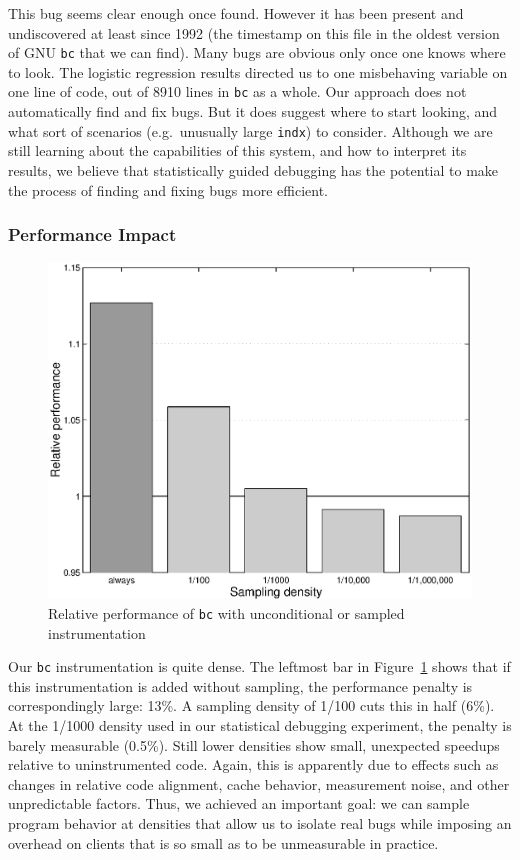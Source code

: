 This bug seems clear enough once found.  However it has been present
and undiscovered at least since 1992 (the time\-stamp on this file in
the oldest version of GNU \texttt{bc} that we can find).  Many bugs
are obvious only once one knows where to look.  The logistic
regression results directed us to one misbehaving variable on one line
of code, out of 8910 lines in \texttt{bc} as a whole.  Our approach
does not automatically find and fix bugs.  But it does suggest where
to start looking, and what sort of scenarios (e.g.\ unusually large
\texttt{indx}) to consider.  Although we are still learning about the
capabilities of this system, and how to interpret its results, we
believe that statistically guided debugging has the potential to make
the process of finding and fixing bugs more efficient.

\subsubsection{Performance Impact}

\begin{figure}
  \centering
  \small
  \includegraphics[width=\columnwidth]{applications/bc_density}
  \caption{Relative performance of \texttt{bc} with unconditional or
    sampled instrumentation}
  \label{fig:bc:slowdown}
\end{figure}

Our \texttt{bc} instrumentation is quite dense.  The leftmost bar in
Figure~\ref{fig:bc:slowdown} shows that if this instrumentation is
added without sampling, the performance penalty is correspondingly
large: 13\%.  A sampling density of 1/100 cuts this in half (6\%).  At
the 1/1000 density used in our statistical debugging experiment, the
penalty is barely measurable (0.5\%).  Still lower densities show
small, unexpected speedups relative to uninstrumented code.  Again,
this is apparently due to effects such as changes in relative code
alignment, cache behavior, measurement noise, and other unpredictable
factors.  Thus, we achieved an important goal: we can sample program
behavior at densities that allow us to isolate real bugs while
imposing an overhead on clients that is so small as to be unmeasurable
in practice.

